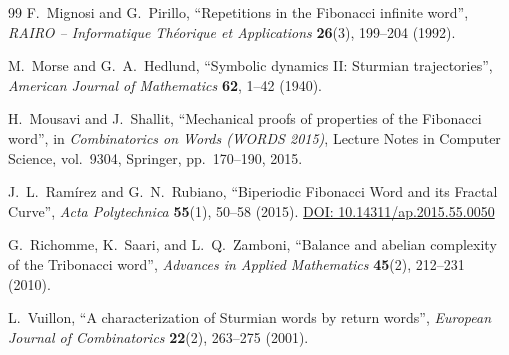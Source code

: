 \documentclass[12pt]{amsart}
\theoremstyle{plain}
\theoremstyle{definition}
\theoremstyle{remark}
\newcommand{\doi}[1]{\href{https://doi.org/#1}{DOI: #1}}
\begin{document}
\begin{thebibliography}{99}
F.~Mignosi and G.~Pirillo,
``Repetitions in the Fibonacci infinite word'',
\emph{RAIRO -- Informatique Th\'eorique et Applications} \textbf{26}(3), 199--204 (1992).

M.~Morse and G.~A.~Hedlund,
``Symbolic dynamics II: Sturmian trajectories'',
\emph{American Journal of Mathematics} \textbf{62}, 1--42 (1940).

H.~Mousavi and J.~Shallit,
``Mechanical proofs of properties of the Fibonacci word'',
in \emph{Combinatorics on Words (WORDS 2015)},
Lecture Notes in Computer Science, vol.~9304, Springer, pp.~170--190, 2015.

J.~L.~Ram\'irez and G.~N.~Rubiano,
``Biperiodic Fibonacci Word and its Fractal Curve'',
\emph{Acta Polytechnica} \textbf{55}(1), 50--58 (2015).
\doi{10.14311/ap.2015.55.0050}

G.~Richomme, K.~Saari, and L.~Q.~Zamboni,
``Balance and abelian complexity of the Tribonacci word'',
\emph{Advances in Applied Mathematics} \textbf{45}(2), 212--231 (2010).

L.~Vuillon,
``A characterization of Sturmian words by return words'',
\emph{European Journal of Combinatorics} \textbf{22}(2), 263--275 (2001).

\end{thebibliography}










 
\end{document}
